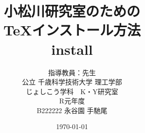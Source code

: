 \documentclass[11pt, a4paper]{jreport}
\begin{document}
\title{小松川研究室のための\\TeXインストール方法\\
install}
\author{指導教員：先生\\
公立 千歳科学技術大学 理工学部\\
じょしこう学科　K・Y研究室\\
R元年度\\
B222222 永谷園 手馳尾}
\date{\today}

\maketitle
{}
\tableofcontents
\end{document}
